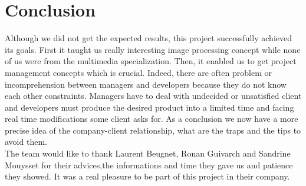 
\section{Conclusion}
Although we did not get the expected results, this project successfully achieved its goals. First it taught us really interesting image processing concept while none of us were from the multimedia specialization. Then, it enabled us to get project management concepts which is crucial. Indeed, there are often problem or incomprehension between managers and developers because they do not know each other constraints. Managers have to deal with undecided or unsatisfied client and developers must produce the desired product into a limited time and facing real time modifications some client asks for. As a conclusion we now have a more precise idea of the company-client relationship, what are the traps and the tips to avoid them.\\


The team would like to thank Laurent Beugnet, Ronan Guivarch and Sandrine Mouysset for their advices,the informations and time they gave us and patience they showed. It was a real pleasure to be part of this project in their company.